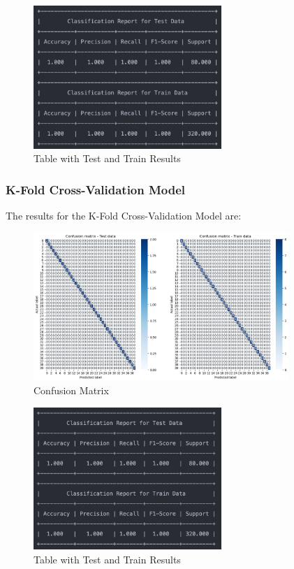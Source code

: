 \documentclass[conference]{IEEEtran}
\begin{document}
\begin{figure}[!h!]
    \includegraphics[width=2.8in]{LogReg/logreg_r_2.png}%
    \caption{Table with Test and Train Results}%
    \label{fig:conf_LogReg_r_2}%
\end{figure}

\subsubsection{K-Fold Cross-Validation Model}

The results for the K-Fold Cross-Validation Model are:

\begin{figure}[!h!]
    \includegraphics[width=3.8in]{LogReg/logreg_3.png}%
    \caption{Confusion Matrix}%
    \label{fig:conf_LogReg_3}%
\end{figure}

\begin{figure}[!h!]
    \includegraphics[width=2.8in]{LogReg/logreg_r_3.png}%
    \caption{Table with Test and Train Results}%
    \label{fig:conf_LogReg_r_3}%
\end{figure}
\end{document}
